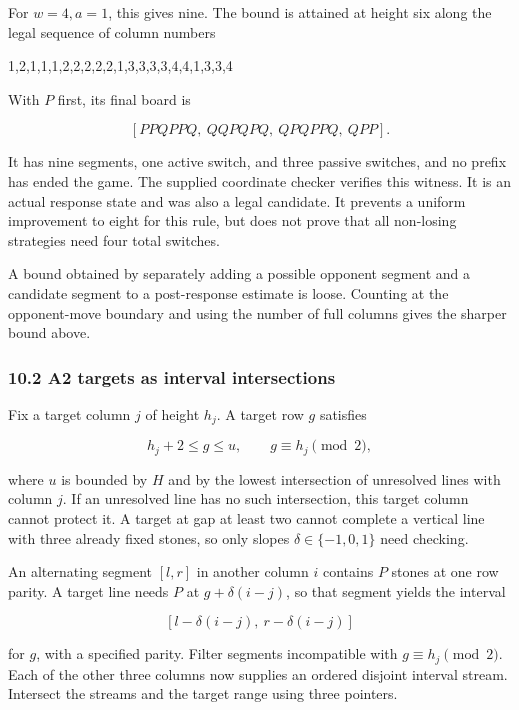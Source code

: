 \documentclass[
  a4paper,
]{article}
\newenvironment{Shaded}{}{}
\newcommand{\NormalTok}[1]{#1}
\begin{document}
For \(w=4,a=1\), this gives nine. The bound is attained at height six
along the legal sequence of column numbers

\begin{Shaded}
\begin{Highlighting}[]
\NormalTok{1,2,1,1,1,2,2,2,2,2,1,3,3,3,3,4,4,1,3,3,4}
\end{Highlighting}
\end{Shaded}

With \(P\) first, its final board is

\[[PPQPPQ,\ QQPQPQ,\ QPQPPQ,\ QPP].\]

It has nine segments, one active switch, and three passive switches, and
no prefix has ended the game. The supplied coordinate checker verifies
this witness. It is an actual response state and was also a legal
candidate. It prevents a uniform improvement to eight for this rule, but
does not prove that all non-losing strategies need four total switches.

A bound obtained by separately adding a possible opponent segment and a
candidate segment to a post-response estimate is loose. Counting at the
opponent-move boundary and using the number of full columns gives the
sharper bound above.

\subsubsection{10.2 A2 targets as interval
intersections}\label{a2-targets-as-interval-intersections}

Fix a target column \(j\) of height \(h_j\). A target row \(g\)
satisfies

\[h_j+2\le g\le u,\qquad g\equiv h_j\pmod2,\]

where \(u\) is bounded by \(H\) and by the lowest intersection of
unresolved lines with column \(j\). If an unresolved line has no such
intersection, this target column cannot protect it. A target at gap at
least two cannot complete a vertical line with three already fixed
stones, so only slopes \(\delta\in\{-1,0,1\}\) need checking.

An alternating segment \([l,r]\) in another column \(i\) contains \(P\)
stones at one row parity. A target line needs \(P\) at
\(g+\delta(i-j)\), so that segment yields the interval

\[[l-\delta(i-j),\ r-\delta(i-j)]\]

for \(g\), with a specified parity. Filter segments incompatible with
\(g\equiv h_j\pmod2\). Each of the other three columns now supplies an
ordered disjoint interval stream. Intersect the streams and the target
range using three pointers.
\end{document}
